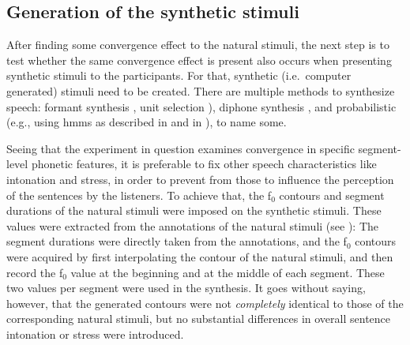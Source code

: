 \subsection{Generation of the synthetic stimuli}
\label{subsec:generation_stimuli_hci}

After finding some convergence effect to the natural stimuli, the next step is to test whether the same convergence effect is present also occurs when presenting synthetic stimuli to the participants.
For that, synthetic (i.e.\ computer generated) stimuli need to be created.
There are multiple methods to synthesize speech:
formant synthesis \citep[e.g.][]{Burkhardt2000verification}, unit selection \citep{Hunt1996unit,Black2003unit}), diphone synthesis \citep{Dutoit1996mbrola}, and probabilistic (e.g., using \acp{hmm} as described in \citet{Zen2005overview} and in \citet{Zen2009statistical}), to name some.

Seeing that the experiment in question examines convergence in specific segment-level phonetic features, it is preferable to fix other speech characteristics like intonation and stress, in order to prevent from those to influence the perception of the sentences by the listeners.
To achieve that, the f$_0$ contours and segment durations of the natural stimuli were imposed on the synthetic stimuli.
These values were extracted from the annotations of the natural stimuli (see \citet{Gessinger2016PundP}):
The segment durations were directly taken from the annotations, and the f$_0$ contours were acquired by first interpolating the contour of the natural stimuli, and then record the f$_0$ value at the beginning and at the middle of each segment.
These two values per segment were used in the synthesis.
It goes without saying, however, that the generated contours were not \emph{completely} identical to those of the corresponding natural stimuli, but no substantial differences in overall sentence intonation or stress were introduced.

